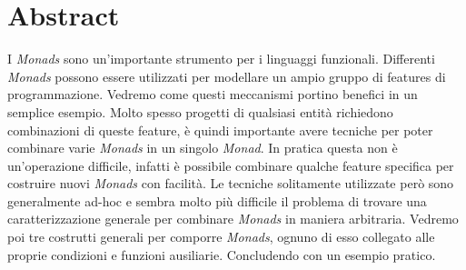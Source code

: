 \section*{Abstract}

I \textit{Monads} sono un'importante strumento per i linguaggi funzionali.
Differenti \textit{Monads} possono essere utilizzati per modellare
un ampio gruppo di features di programmazione.
Vedremo come questi meccanismi portino benefici in un semplice esempio.
Molto spesso progetti di qualsiasi entità richiedono combinazioni di queste
feature, è quindi importante avere tecniche per poter combinare varie
\textit{Monads} in un singolo \textit{Monad}.
In pratica questa non è un'operazione difficile, infatti è
possibile combinare qualche feature specifica per costruire nuovi
\textit{Monads} con facilità.
Le tecniche solitamente utilizzate però sono generalmente ad-hoc e sembra molto
più difficile il problema di trovare una caratterizzazione generale per
combinare \textit{Monads} in maniera arbitraria.
Vedremo poi tre costrutti generali per comporre \textit{Monads}, ognuno di esso
collegato alle proprie condizioni e funzioni ausiliarie.
Concludendo con un esempio pratico.